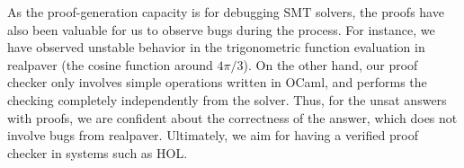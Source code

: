 As the proof-generation capacity is for debugging SMT solvers, the
proofs have also been valuable for us to observe bugs during the
process. For instance, we have observed unstable behavior in the
trigonometric function evaluation in {\sf realpaver} (the cosine
function around $4\pi/3$). On the other hand, our proof checker only
involves simple operations written in {\sf OCaml}, and performs the
checking completely independently from the solver. Thus, for the {\sf
  unsat} answers with proofs, we are confident about the correctness
of the answer, which does not involve bugs from {\sf realpaver}.
Ultimately, we aim for having a verified proof checker in systems such
as HOL.

